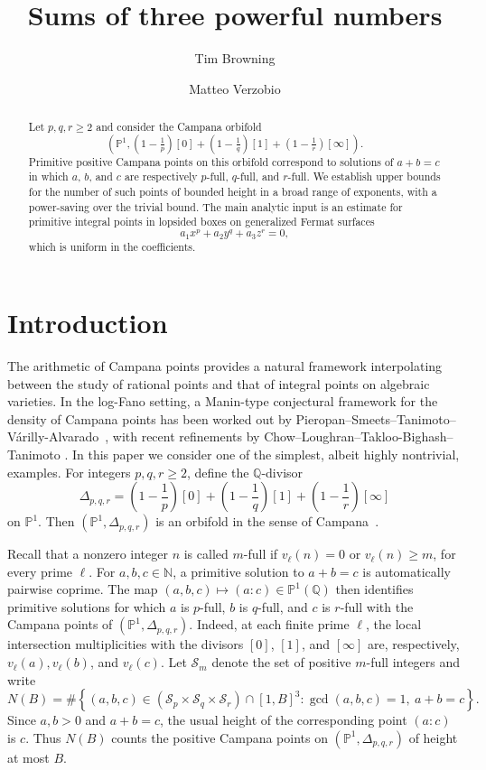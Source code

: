 \documentclass[a4paper,11pt,twoside,reqno]{amsart}
\title{Sums of three powerful numbers}
\author{Tim Browning}
\author{Matteo Verzobio}
\date{}
\theoremstyle{definition}
\theoremstyle{remark}
\numberwithin{equation}{section}
\newcommand\NN{\mathbb{N}}
\newcommand\QQ{\mathbb{Q}}
\newcommand\PP{\mathbb{P}}
\newcommand\1{\mathbf{1}}
\renewcommand{\geq}{\geqslant}
\begin{document}
\begin{abstract}
Let $p,q,r\geq 2$ and consider the Campana orbifold
\[
\left(
 \PP^1,
 \left(1-\tfrac1p\right)[0]
 +\left(1-\tfrac1q\right)[1]
 +\left(1-\tfrac1r\right)[\infty]
\right).
\]
Primitive positive Campana points on this orbifold correspond to
solutions of $a+b=c$ in which $a$, $b$, and $c$ are respectively
$p$-full, $q$-full, and $r$-full. We establish upper
bounds for the number of such points of bounded height in a broad
range of exponents, with a power-saving over the trivial bound. 
The main analytic input is an estimate
for primitive integral points in lopsided boxes on generalized
Fermat surfaces
\[
a_1x^p+a_2y^q+a_3z^r=0,
\]
which is uniform in the coefficients.
\end{abstract}

\maketitle

\thispagestyle{empty}
 \setcounter{tocdepth}{1}
 \tableofcontents


\section{Introduction}

The arithmetic of Campana points provides a natural framework
interpolating between the study of rational points and that of
integral points on algebraic varieties. 
In the log-Fano setting, 
a Manin-type conjectural framework for the density of Campana points has been worked out by 
Pieropan--Smeets--Tanimoto--V\'arilly-Alvarado~\cite{c-manin}, with 
recent refinements by 
Chow--Loughran--Takloo-Bighash--Tanimoto 
\cite{chow}. 
In this paper we consider one of the simplest, albeit 
highly
nontrivial, examples. For integers $p,q,r\geq2$, define the $\QQ$-divisor
\[
\Delta_{p,q,r}
 =
 \left(1-\frac1p\right)[0]
 +\left(1-\frac1q\right)[1]
 +\left(1-\frac1r\right)[\infty]
\]
on $\PP^1$. Then 
$(\PP^1,\Delta_{p,q,r})$ is an orbifold 
in the sense of Campana~\cite{campana}.

Recall that a nonzero integer $n$ is called $m$-full if
$v_\ell(n)=0$ or $v_\ell(n)\geq m$, 
for every prime $\ell$. 
For $a,b,c\in\NN$, 
a primitive solution to 
$a+b=c$ is automatically pairwise coprime. The map
$(a,b,c)\mapsto (a:c)\in\PP^1(\QQ)$
then identifies primitive solutions for which $a$
is $p$-full, $b$ is $q$-full, and $c$ is $r$-full 
with the Campana points of
 $(\PP^1,\Delta_{p,q,r})$.
Indeed, at
each finite prime $\ell$, the local intersection multiplicities with
the divisors $[0]$, $[1]$, and $[\infty]$ are, respectively, 
$v_\ell(a), v_\ell(b)$, and $v_\ell(c)$.
Let $\mathcal S_m$ denote the set of positive $m$-full integers and
write
\begin{equation}\label{eq:hawk}
N(B)
 =
 \#\left\{
 (a,b,c)\in
 (\mathcal S_p\times\mathcal S_q\times\mathcal S_r)\cap[1,B]^3:
 \gcd(a,b,c)=1,\ a+b=c
 \right\}.
\end{equation}
Since $a,b>0$ and $a+b=c$, the usual height of the corresponding
point $(a:c)$ is $c$. Thus $N(B)$ counts the positive Campana points
on $(\PP^1,\Delta_{p,q,r})$ of height at most $B$.
\end{document}
